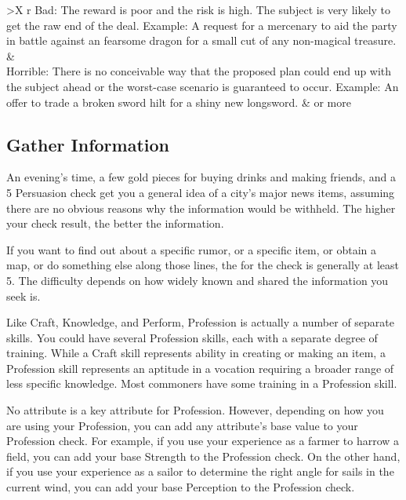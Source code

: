 \begin{dtable*}
\begin{dtabularx}{\textwidth}{>{\lcol}X r}
                Bad: The reward is poor and the risk is high. The subject is very likely to get the raw end of the deal. Example: A request for a mercenary to aid the party in battle against an fearsome dragon for a small cut of any non-magical treasure.                                                                    &                                                             \\
                Horrible: There is no conceivable way that the proposed plan could end up with the subject ahead or the worst-case scenario is guaranteed to occur. Example: An offer to trade a broken sword hilt for a shiny new longsword.                                                                                      &  or more                                                    \\
            \end{dtabularx}
        \end{dtable*}

    \subsection{Gather Information}
        An evening's time, a few gold pieces for buying drinks and making friends, and a  5 Persuasion check get you a general idea of a city's major news items, assuming there are no obvious reasons why the information would be withheld. The higher your check result, the better the information.

        If you want to find out about a specific rumor, or a specific item, or obtain a map, or do something else along those lines, the  for the check is generally at least 5.
        The difficulty depends on how widely known and shared the information you seek is.

\newpage
{}
        Like Craft, Knowledge, and Perform, Profession is actually a number of separate skills.
        You could have several Profession skills, each with a separate degree of training.
        While a Craft skill represents ability in creating or making an item, a Profession skill represents an aptitude in a vocation requiring a broader range of less specific knowledge.
        Most commoners have some training in a Profession skill.

        No attribute is a key attribute for Profession.
        However, depending on how you are using your Profession, you can add any attribute's base value to your Profession check.
        For example, if you use your experience as a farmer to harrow a field, you can add your base Strength to the Profession check.
        On the other hand, if you use your experience as a sailor to determine the right angle for sails in the current wind, you can add your base Perception to the Profession check.

